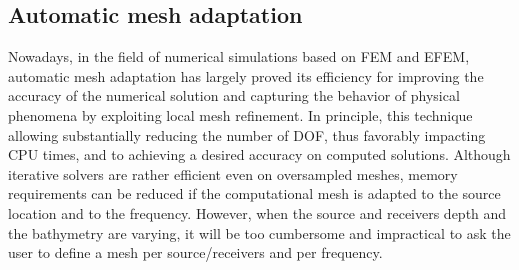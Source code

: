 \documentclass[review]{elsarticle}
\begin{document}
\subsection{Automatic mesh adaptation}
\label{Automatic_mesh_test}
Nowadays, in the field of numerical simulations based on FEM and EFEM, automatic mesh adaptation has largely proved its efficiency for improving the accuracy of the numerical solution and capturing the behavior of physical phenomena by exploiting local mesh refinement. In principle, this technique allowing substantially reducing the number of DOF, thus favorably impacting CPU times, and to achieving a desired accuracy on computed solutions. Although iterative solvers are rather efficient even on oversampled meshes, memory requirements can be reduced if the computational mesh is adapted to the source location and to the frequency. However, when the source and receivers depth and the bathymetry are varying, it will be too cumbersome and impractical to ask the user to define a mesh per source/receivers and per frequency. 
\end{document}
